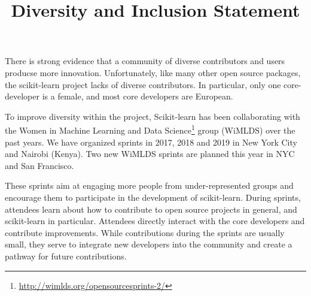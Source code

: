 \documentclass{article}
\title{Diversity and Inclusion Statement}
\begin{document}
 
    \maketitle
 

There is strong evidence that a community of diverse contributors and users producse more innovation. Unfortunately, like many other open source packages, the scikit-learn project lacks of diverse contributors. In particular, only one core-developer is a female, and most core developers are European.

To improve diversity within the project, Scikit-learn has been collaborating with the Women in Machine Learning and Data Science\footnote{\href{http://wimlds.org/opensourcesprints-2/}{http://wimlds.org/opensourcesprints-2/}} group (WiMLDS) over the past years. We have organized sprints in 2017, 2018 and 2019 in New York City and Nairobi (Kenya). Two new WiMLDS sprints are planned this year in NYC and San Francisco.

These sprints aim at engaging more people from under-represented groups and
encourage them to participate in the development of scikit-learn. During sprints, attendees learn about how to contribute to open source projects in general, and scikit-learn in particular. Attendees directly interact with the core developers and contribute improvements. While contributions during the sprints are usually small, they serve to integrate new developers into the community and create a pathway for future contributions.
\end{document}
